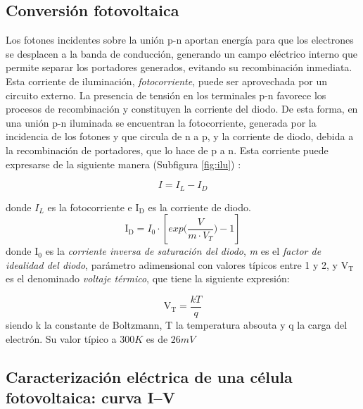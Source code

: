 \subsection{Conversión fotovoltaica}


Los fotones incidentes sobre la unión p-n aportan energía para que los electrones se desplacen a la banda de conducción, generando un campo eléctrico interno que permite separar los portadores generados, evitando su recombinación inmediata. Esta corriente de iluminación, \textit{fotocorriente}, puede ser aprovechada por un circuito externo. La presencia de tensión en los terminales p-n favorece los procesos de recombinación y constituyen la corriente del diodo. De esta forma, en una unión p-n iluminada se encuentran la fotocorriente, generada por la incidencia de los fotones y que circula de n a p, y la corriente de diodo, debida a la recombinación de portadores, que lo hace de p a n. Esta corriente puede expresarse de la siguiente manera (Subfigura \ref{fig:ilu}\cite{perpinan2013}) :

\begin{equation}
	I = I_L - I_D
	\label{eq:I}
\end{equation}


donde $I_L$ es la fotocorriente e $\mathrm{I_D}$ es la corriente de diodo. 
\begin{equation}
	\mathrm{I_D} =  I_0 \cdot [exp \big( \frac{V}{m \cdot V_T} \big) -1]
\end{equation}
donde $\mathrm{I_0}$ es la \textit{corriente inversa de saturación del diodo}, \textit{m} es el \textit{factor de idealidad del diodo}, parámetro adimensional con valores típicos entre 1 y 2, y $\mathrm{V_T}$ es el denominado \textit{voltaje térmico}, que tiene la siguiente expresión:

\begin{equation}
	\mathrm{V_T} = \frac{kT}{q}
\end{equation}
siendo k la constante de Boltzmann, T la temperatura absouta y q la carga del electrón. Su valor típico a $300 K$ es de $26 mV$ 

\subsection{Caracterización eléctrica de una célula fotovoltaica: curva I--V}


